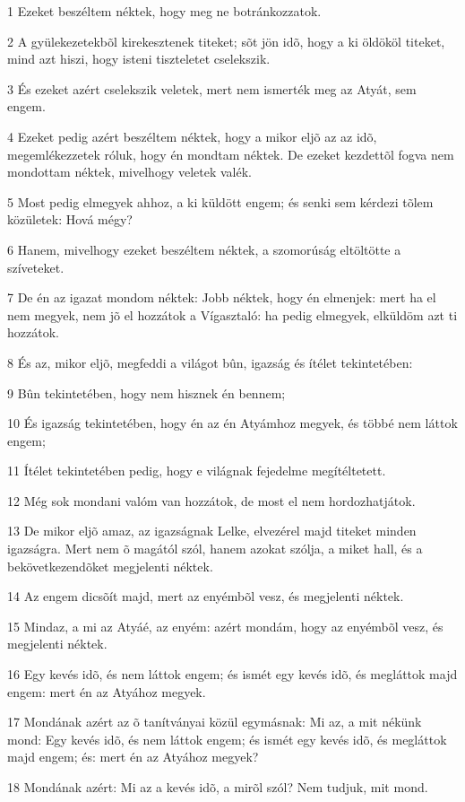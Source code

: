 \par 1 Ezeket beszéltem néktek, hogy meg ne botránkozzatok.
\par 2 A gyülekezetekbõl kirekesztenek titeket; sõt jön idõ, hogy a ki öldököl titeket, mind azt hiszi, hogy isteni tiszteletet cselekszik.
\par 3 És ezeket azért cselekszik veletek, mert nem ismerték meg az Atyát, sem engem.
\par 4 Ezeket pedig azért beszéltem néktek, hogy a mikor eljõ az az idõ, megemlékezzetek róluk, hogy én mondtam néktek. De ezeket kezdettõl fogva nem mondottam néktek, mivelhogy veletek valék.
\par 5 Most pedig elmegyek ahhoz, a ki küldött engem; és senki sem kérdezi tõlem közületek: Hová mégy?
\par 6 Hanem, mivelhogy ezeket beszéltem néktek, a szomorúság eltöltötte a szíveteket.
\par 7 De én az igazat mondom néktek: Jobb néktek, hogy én elmenjek: mert ha el nem megyek, nem jõ el hozzátok a Vígasztaló: ha pedig elmegyek, elküldöm azt ti hozzátok.
\par 8 És az, mikor eljõ, megfeddi a világot bûn, igazság és ítélet tekintetében:
\par 9 Bûn tekintetében, hogy nem hisznek én bennem;
\par 10 És igazság tekintetében, hogy én az én Atyámhoz megyek, és többé nem láttok engem;
\par 11 Ítélet tekintetében pedig, hogy e világnak fejedelme megítéltetett.
\par 12 Még sok mondani valóm van hozzátok, de most el nem hordozhatjátok.
\par 13 De mikor eljõ amaz, az igazságnak Lelke, elvezérel majd titeket minden igazságra. Mert nem õ magától szól, hanem azokat szólja, a miket hall, és a bekövetkezendõket megjelenti néktek.
\par 14 Az engem dicsõít majd, mert az enyémbõl vesz, és megjelenti néktek.
\par 15 Mindaz, a mi az Atyáé, az enyém: azért mondám, hogy az enyémbõl vesz, és megjelenti néktek.
\par 16 Egy kevés idõ, és nem láttok engem; és ismét egy kevés idõ, és megláttok majd engem: mert én az Atyához megyek.
\par 17 Mondának azért az õ tanítványai közül egymásnak: Mi az, a mit nékünk mond: Egy kevés idõ, és nem láttok engem; és ismét egy kevés idõ, és megláttok majd engem; és: mert én az Atyához megyek?
\par 18 Mondának azért: Mi az a kevés idõ, a mirõl szól? Nem tudjuk, mit mond.
